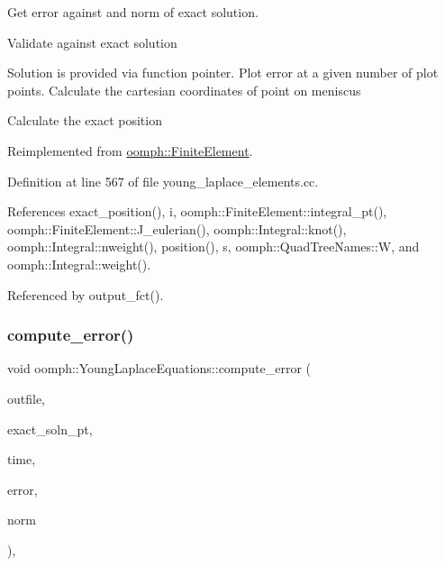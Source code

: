 Get error against and norm of exact solution. 

Validate against exact solution

Solution is provided via function pointer. Plot error at a given number of plot points. Calculate the cartesian coordinates of point on meniscus

Calculate the exact position 

Reimplemented from \hyperlink{classoomph_1_1FiniteElement_a73c79a1f1e5b1d334757812a6bbd58ff}{oomph\+::\+Finite\+Element}.



Definition at line 567 of file young\+\_\+laplace\+\_\+elements.\+cc.



References exact\+\_\+position(), i, oomph\+::\+Finite\+Element\+::integral\+\_\+pt(), oomph\+::\+Finite\+Element\+::\+J\+\_\+eulerian(), oomph\+::\+Integral\+::knot(), oomph\+::\+Integral\+::nweight(), position(), s, oomph\+::\+Quad\+Tree\+Names\+::W, and oomph\+::\+Integral\+::weight().



Referenced by output\+\_\+fct().

\mbox{\label{classoomph_1_1YoungLaplaceEquations_a488ccd6f86ba5516726af04c18a48b4e}} 
\subsubsection{\texorpdfstring{compute\+\_\+error()}{compute\_error()}\hspace{0.1cm}{\footnotesize\ttfamily [2/2]}}
{\footnotesize\ttfamily void oomph\+::\+Young\+Laplace\+Equations\+::compute\+\_\+error (\begin{DoxyParamCaption}\item[{std\+::ostream \&}]{outfile,  }\item[{\hyperlink{classoomph_1_1FiniteElement_ad4ecf2b61b158a4b4d351a60d23c633e}{Finite\+Element\+::\+Unsteady\+Exact\+Solution\+Fct\+Pt}}]{exact\+\_\+soln\+\_\+pt,  }\item[{const double \&}]{time,  }\item[{double \&}]{error,  }\item[{double \&}]{norm }\end{DoxyParamCaption})\hspace{0.3cm}{\ttfamily [inline]}, {\ttfamily [virtual]}}



